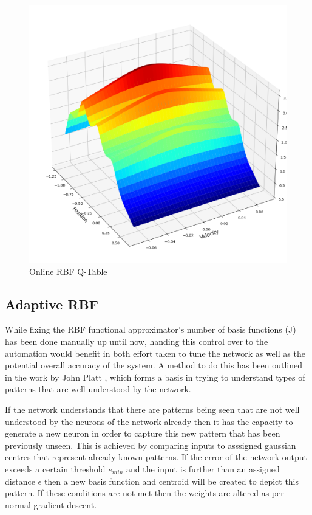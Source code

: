 \documentclass[sigconf]{acmart}
\begin{document}
\begin{figure}[h]
  \centering
  \includegraphics[scale=0.2]{../MCar/SARSAanim/SARSA_RBF_e_2.png}
  \caption{Online RBF Q-Table}
  \label{fig:SARSA}
\end{figure}

\subsection{Adaptive RBF}

While fixing the RBF functional approximator's number of basis functions (J) has been done manually up until now, handing this control over to the automation would benefit in both effort taken to tune the network as well as 
the potential overall accuracy of the system. 
A method to do this has been outlined in the work by John Platt \cite{RAN}, which forms a basis in trying to understand types of patterns that are well understood by the network.

If the network understands that there are patterns being seen that are not well understood by the neurons of the network already then it has the capacity to generate a new neuron in order to capture this new pattern that has been previously unseen.
This is achieved by comparing inputs to asssigned gaussian centres that represent already known patterns. If the error of the network output exceeds a certain threshold $e_{min}$ and the input is further than an assigned distance $\epsilon$ then a new basis function and centroid will be created to depict this pattern.
If these conditions are not met then the weights are altered as per normal gradient descent.
\end{document}
